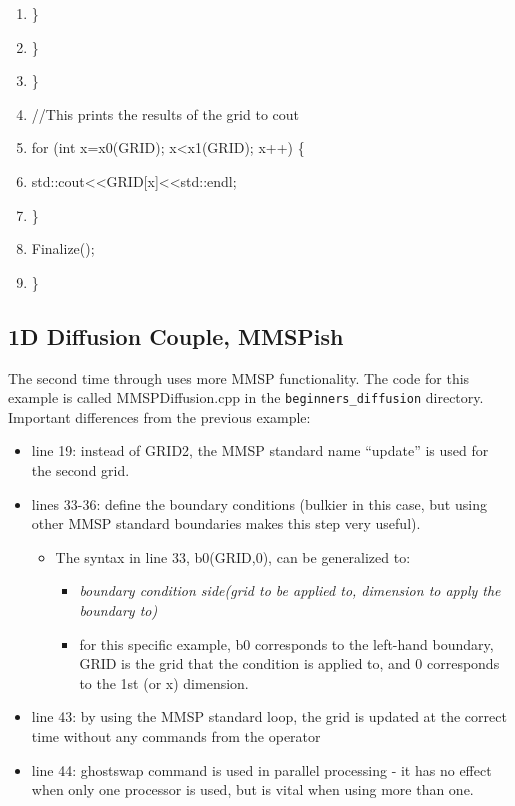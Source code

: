 \documentclass{article}
\begin{document}
\begin{shadebox}
\begin{enumerate}
\item \hspace{10pt} \hspace{10pt}                 \}
\item \hspace{10pt}         \}
\item \}
\item //This prints the results of the grid to cout
\item for (int x=x0(GRID); x\textless x1(GRID); x++) \{
\item \hspace{10pt}         std::cout\textless \textless GRID[x]\textless \textless std::endl;
\item \}
\item Finalize();
\item \}
\end{enumerate}

\end{shadebox}

\subsection{1D Diffusion Couple, MMSPish}
The second time through uses more MMSP functionality. The code for this example is called MMSPDiffusion.cpp in the {\tt beginners\_diffusion} directory. Important differences from the previous example:
\begin{itemize} \itemsep1pt \parskip0pt 
\item line 19: instead of GRID2, the MMSP standard name “update” is used for the second grid.
\item lines 33-36: define the boundary conditions (bulkier in this case, but using other MMSP standard boundaries makes this step very useful).
\begin{itemize} \itemsep1pt \parskip0pt 
\item The syntax in line 33, b0(GRID,0), can be generalized to:
\begin{itemize} \itemsep1pt \parskip0pt 
\item \textit{boundary condition side(grid to be applied to, dimension to apply the boundary to)}
\item for this specific example, b0 corresponds to the left-hand boundary, GRID is the grid that the condition is applied to, and 0 corresponds to the 1st (or x) dimension.
\end {itemize}
\end {itemize}
\item line 43: by using the MMSP standard loop, the grid is updated at the correct time without any commands from the operator
\item line 44: ghostswap command is used in parallel processing - it has no effect when only one processor is used, but is vital when using more than one.
\end {itemize}
\end{document}
